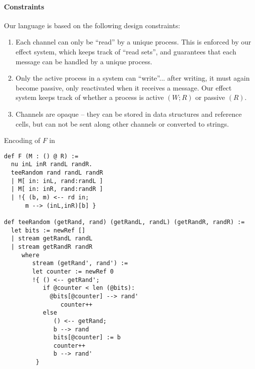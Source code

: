 \paragraph{Constraints}
Our language is based on the following design constraints:
\begin{enumerate}
\item Each channel can only be “read” by a unique process. This is enforced by our effect system, which keeps track of “read sets”, and guarantees that each message can be handled by a unique process.
\item Only the active process in a system can “write”... after writing, it must again become passive, only reactivated when it receives a message. Our effect system keeps track of whether a process is active $(W; R)$ or passive $(R)$.
\item Channels are opaque -- they can be stored in data structures and reference cells, but can not be sent along other channels or converted to strings.
\end{enumerate}



Encoding of $F$ in \lang
\begin{figure*}
\begin{lstlisting} 
def F (M : () @ R) :=
  nu inL inR randL randR. 
  teeRandom rand randL randR
  | M[ in: inL, rand:randL ]
  | M[ in: inR, rand:randR ]
  | !{ (b, m) <-- rd in;
      m --> (inL,inR)[b] }

def teeRandom (getRand, rand) (getRandL, randL) (getRandR, randR) :=
  let bits := newRef []
  | stream getRandL randL
  | stream getRandR randR
     where
        stream (getRand', rand') :=
        let counter := newRef 0
        !{ () <-- getRand';
           if @counter < len (@bits):
             @bits[@counter] --> rand'
                counter++
           else
              () <-- getRand; 
              b --> rand
              bits[@counter] := b
              counter++
              b --> rand'
         }
\end{lstlisting}
\end{figure*}



